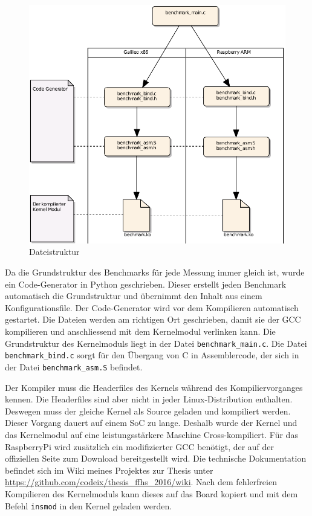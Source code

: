 \begin{figure}
\centering
\includegraphics[scale=0.8]{images/filestructure.pdf}
\caption{Dateistruktur}
\label{fig:filestructure}
\end{figure}


Da die Grundstruktur des Benchmarks für jede Messung immer gleich ist, wurde ein Code-Generator in Python geschrieben. Dieser erstellt jeden Benchmark automatisch die Grundstruktur und übernimmt den Inhalt aus einem Konfigurationsfile. Der Code-Generator wird vor dem Kompilieren automatisch gestartet. Die Dateien werden am richtigen Ort geschrieben, damit sie der GCC kompilieren und anschliessend mit dem Kernelmodul verlinken kann. Die Grundstruktur des Kernelmoduls liegt in der Datei \texttt{benchmark\_main.c}. Die Datei \texttt{benchmark\_bind.c} sorgt für den Übergang von C in Assemblercode, der sich in der Datei \texttt{benchmark\_asm.S} befindet.
\par
Der Kompiler muss die Headerfiles des Kernels während des Kompiliervorganges kennen. Die Headerfiles sind aber nicht in jeder Linux-Distribution enthalten. Deswegen muss der gleiche Kernel als Source geladen und kompiliert werden. Dieser Vorgang dauert auf einem SoC zu lange. Deshalb wurde der Kernel und das Kernelmodul auf eine leistungsstärkere Maschine Cross-kompiliert. Für das RaspberryPi wird zusätzlich ein modifizierter GCC benötigt, der auf der offiziellen Seite zum Download bereitgestellt wird. Die technische Dokumentation befindet sich im Wiki meines Projektes zur Thesis unter \url{https://github.com/codeix/thesis_ffhs_2016/wiki}. Nach dem fehlerfreien Kompilieren des Kernelmoduls kann dieses auf das Board kopiert und mit dem Befehl \texttt{insmod} in den Kernel geladen werden.

